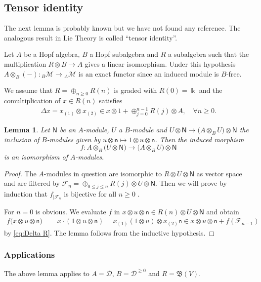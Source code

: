 \documentclass[reqno]{amsart}
\newcommand{\cM}{\mathcal{M}}
\renewcommand{\_}[1]{_{\left( #1 \right)}}
\renewcommand{\^}[1]{^{\left( #1 \right)}}
\newcommand{\ot}{{\otimes}}
\newcommand{\ku}{\Bbbk}
\newcommand\fN{\mathsf{N}}
\newcommand\fn{\mathsf{n}}
\newcommand{\D}{\mathcal{D}}
\newcommand{\BV}{{\mathfrak B}}
\theoremstyle{plain}
\newtheorem{lema}{Lemma}[section]
\theoremstyle{definition}
\theoremstyle{remark}
\begin{document}
\subsection{Tensor identity} The next lemma is probably known but we have not found any reference. The analogous result in Lie Theory is called ``tensor identity''.

Let $A$ be a Hopf algebra, $B$ a Hopf subalgebra and $R$ a subalgebra such that the multiplication $R\ot B\longrightarrow A$ gives a linear isomorphism. Under this hypothesis $A\ot_{B}(-):{}_{B}\cM\longrightarrow{}_{A}\cM$ is an exact functor since an induced module is $B$-free.




We assume that $R=\oplus_{n\geq0}R(n)$ is graded with $R(0)=\ku$ and the comultiplication of $x\in R(n)$ satisfies
\begin{align}\label{eq:Delta R}
\Delta x=x\_{1}\ot x\_{2}\in x\ot1+\oplus_{j=0}^{n-1} R(j)\ot A,\quad\forall n\geq0.
\end{align}


\begin{lema}\label{le:tensor identity}
Let $\fN$ be an $A$-module, $U$ a $B$-module and $U\ot\fN\longrightarrow\bigl(A\ot_{B}U\bigr)\ot\fN$ the inclusion of $B$-modules given by $u\ot\fn\mapsto1\ot u\ot\fn$. Then the induced morphism 
$$
f:A\ot_{B}\bigl(U\ot\fN\bigr)\longrightarrow\bigl(A\ot_{B}U\bigr)\ot\fN
$$
is an isomorphism of $A$-modules.
\end{lema}


\begin{proof}
The $A$-modules in question are isomorphic to $R\ot U\ot\fN$ as vector space and are filtered by $\mathcal{F}_n=\oplus_{0\leq j\leq n}R(j)\ot U\ot\fN$. Then we will prove by induction that $f_{|\mathcal{F}_n}$ is bijective for all $n\geq0$ .

For $n=0$ is obvious. We evaluate $f$ in $x\ot u\ot\fn\in R(n)\ot U\ot\fN$ and obtain
\begin{align*}
f\bigr(x\ot u\ot\fn\bigr)&=x\cdot(1\ot u\ot\fn)=x\_{1}(1\ot u)\ot x\_{2}\fn\in x\ot u\ot \fn+ f(\mathcal{F}_{n-1})
\end{align*}
by \eqref{eq:Delta R}. The lemma follows from the inductive hypothesis.
\end{proof}

\subsubsection{Applications} The above lemma applies to $A=\D$, $B=\D^{\geq0}$ and $R=\BV(V)$. 
\end{document}
